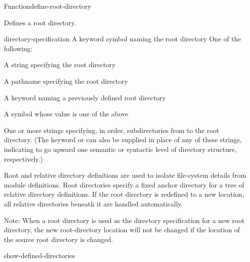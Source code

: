 \documentclass[10pt,twoside,english,pdftex]{article}
\begin{document}

\begin{functiondoc}{Function}{define-root-directory}{  } 
%
%
%
%

\fnsyntax 

\fnpurpose Defines a root directory.

\fnpackage {}

\fnmodule {}

\fnargs
\begin{args}{directory-specification}
\arg[name] A keyword symbol naming the root directory
 One of the following:
\begin{tightitemize}
\item A string specifying the root directory
\item A pathname specifying the root directory
\item A keyword naming a previously defined root directory
\item A symbol whose value is one of the above
\end{tightitemize}
\arg[subdirectories] One or more strings specifying, in order, subdirectories
from  to the root directory. (The keyword
 or  can also be supplied in place of any of these
strings, indicating to go upward one semantic or syntactic level of directory
structure, respectively.)
\end{args}

\fndescription Root and relative directory definitions are used to isolate
file-system details from module definitions.  Root directories specify a fixed
anchor directory for a tree of relative directory definitions.  If the root
directory is redefined to a new location, all relative directories beneath it
are handled automatically.

Note: When a root directory is used as the directory specification for a new
root directory, the new root-directory location will not be changed if the
location of the source root directory is changed.

\begin{alsos}{show-defined-directories}
\end{alsos}


\end{functiondoc}
\end{document}
